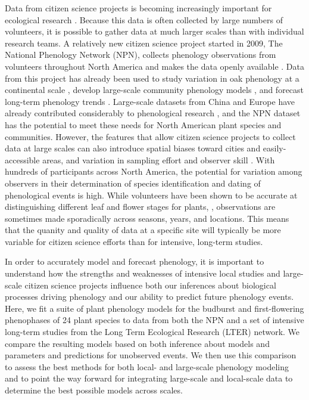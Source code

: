 \documentclass[fleqn,12pt,lineno]{article}
\begin{document}
Data from citizen science projects is becoming increasingly important for ecological research \citep{kelling2009, dickinson2010, tulloch2013}. Because this data is often collected by large numbers of volunteers, it is possible to gather data at much larger scales than with individual research teams. A relatively new citizen science project started in 2009, The National Phenology Network (NPN), collects phenology observations from volunteers throughout North America and makes the data openly available \citep{npncitation}. Data from this project has already been used to study variation in oak phenology at a continental scale \citep{gerst2017}, develop large-scale community phenology models \citep{melaas2016}, and forecast long-term phenology trends \citep{jeong2013}. Large-scale datasets from China and Europe have already contributed considerably to phenological research \citep{xu2013, olsson2014, basler2016, zhang2017}, and the NPN dataset has the potential to meet these needs for North American plant species and communities. However, the features that allow citizen science projects to collect data at large scales can also introduce spatial biases toward cities and easily-accessible areas, and variation in sampling effort and observer skill \citep{dickinson2010}. With hundreds of participants across North America, the potential for variation among observers in their determination of species identification and dating of phenological events is high. While volunteers have been shown to be accurate at distinguishing different leaf and flower stages for plants, \citep{fuccillo2015}, observations are sometimes made sporadically across seasons, years, and locations. This means that the quanity and quality of data at a specific site will typically be more variable for citizen science efforts than for intensive, long-term studies.

In order to accurately model and forecast phenology, it is important to understand how the strengths and weaknesses of intensive local studies and large-scale citizen science projects influence both our inferences about biological processes driving phenology and our ability to predict future phenology events. Here, we fit a suite of plant phenology models for the budburst and first-flowering phenophases of 24 plant species to data from both the NPN and a set of intensive long-term studies from the Long Term Ecological Research (LTER) network. We compare the resulting models based on both inference about models and parameters and predictions for unobserved events. We then use this comparison to assess the best methods for both local- and large-scale phenology modeling and to point the way forward for integrating large-scale and local-scale data to determine the best possible models across scales.
\end{document}
